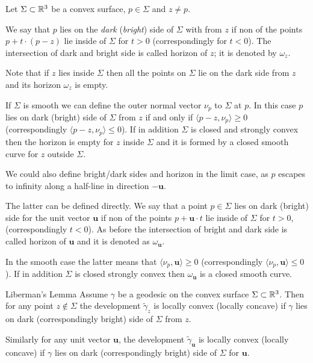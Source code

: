 \documentclass[a4paper,10pt]{article}
\begin{document}
Let $\Sigma\subset\mathbb{R}^3$ be a convex surface,
$p\in\Sigma$ and $z\ne p$.

We say that $p$ lies on the \emph{dark} (\emph{bright}) side of $\Sigma$ with from $z$ 
if non of the points $p+t\cdot(p-z)$ lie inside of $\Sigma$ for $t>0$ (correspondingly for $t<0$).
The intersection of dark and bright side is called horizon of $z$;
it is denoted by $\omega_z$.

Note that if $z$ lies inside $\Sigma$ 
then all the points on $\Sigma$ lie on the dark side from $z$ and its horizon $\omega_z$ is empty.

If $\Sigma$ is smooth we can define the outer normal vector $\nu_p$ to $\Sigma$ at $p$.
In this case $p$ lies on dark (bright) side of $\Sigma$ from $z$
if and only if $\langle p-z,\nu_p\rangle\ge 0$
(correspondingly $\langle p-z,\nu_p\rangle\le 0$).
If in addition $\Sigma$ is closed and strongly convex then the horizon is empty for $z$ inside $\Sigma$ 
and it is formed by a closed smooth curve for $z$ outside $\Sigma$.

We could also define bright/dark sides and horizon in the limit case,
as $p$ escapes to infinity along a half-line in direction $-\bm{u}$.

The latter can be defined directly.
We say that a point $p\in\Sigma$ lies on dark (bright) side for the unit vector $\bm{u}$ if non of the points $p+\bm{u}\cdot t$ lie inside of $\Sigma$ for $t>0$, (correspondingly $t<0$).
As before the intersection of bright and dark side is called horizon of $\bm{u}$ and it is denoted as $\omega_{\bm{u}}$.

In the smooth case the latter means that $\langle \nu_p,\bm{u}\rangle\ge 0$ (correspondingly $\langle \nu_p,\bm{u}\rangle\le 0$).
If in addition $\Sigma$ is closed strongly convex then $\omega_{\bm{u}}$ is a closed smooth curve.

\begin{thm}{Liberman's Lemma}\label{lem:liberman}
Assume $\gamma$ be a geodesic on the convex surface $\Sigma\subset \mathbb{R}^3$.
Then for any point $z\notin\Sigma$ the development $\tilde\gamma_z$ is locally convex (locally concave) if $\gamma$ lies on dark (correspondingly bright) side of $\Sigma$ from $z$.

Similarly for any unit vector $\bm{u}$,
the development $\tilde\gamma_{\bm{u}}$ is locally convex (locally concave) if $\gamma$ lies on dark (correspondingly bright) side of $\Sigma$ for $\bm{u}$.

\end{thm}
\end{document}
